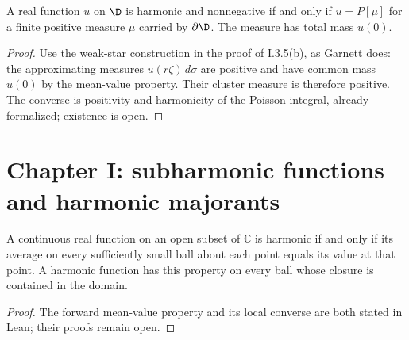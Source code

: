 \begin{theorem}
  \label{thm:I_3_5(c)}
  \leanok
  \mainline
  A real function $u$ on $\D$ is harmonic and nonnegative if and only if
  $u=P[\mu]$ for a finite positive measure $\mu$ carried by $\partial\D$.
  The measure has total mass $u(0)$.
  \begin{proof}
    \notready
    Use the weak-star construction in the proof of I.3.5(b), as Garnett
    does: the approximating measures $u(r\zeta)\,d\sigma$ are positive
    and have common mass $u(0)$ by the mean-value property. Their cluster
    measure is therefore positive. The converse is positivity and
    harmonicity of the Poisson integral, already formalized; existence is open.
  \end{proof}
\end{theorem}

\section{Chapter I: subharmonic functions and harmonic majorants}

\begin{theorem}
  \label{thm:harmonic_mean_value}
  \leanok
  A continuous real function on an open subset of $\mathbb C$ is harmonic
  if and only if its average on every sufficiently small ball about each
  point equals its value at that point. A harmonic function has this property
  on every ball whose closure is contained in the domain.
  \begin{proof}
    \notready
    The forward mean-value property and its local converse are both stated
    in Lean; their proofs remain open.
  \end{proof}
\end{theorem}

